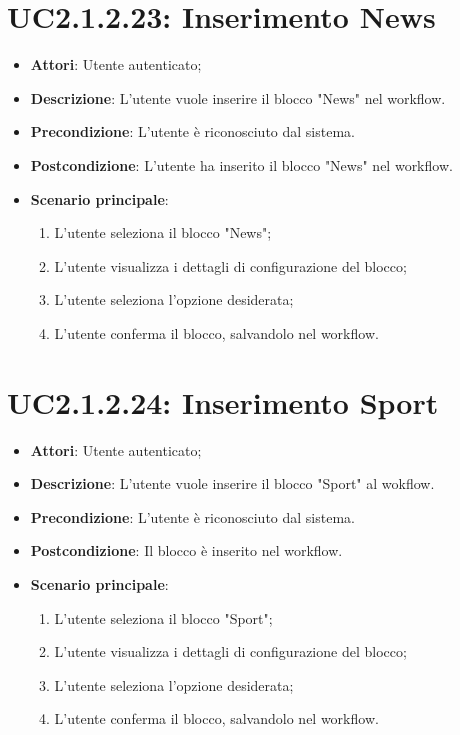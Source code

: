 \section{UC2.1.2.23: Inserimento News}
\label{UC2.1.2.23}
\begin{itemize}
	\item \textbf{Attori}: Utente autenticato;
	\item \textbf{Descrizione}: L'utente vuole inserire il blocco "News" nel workflow.
	\item \textbf{Precondizione}: L'utente è riconosciuto dal sistema.
	\item \textbf{Postcondizione}: L'utente ha inserito il blocco "News" nel workflow.
	\item \textbf{Scenario principale}:
	\begin{enumerate} \item L'utente seleziona il blocco "News";  \item L'utente visualizza i dettagli di configurazione del blocco; \item  L'utente seleziona l'opzione desiderata;  \item  L'utente conferma il blocco, salvandolo nel workflow.\end{enumerate}
\end{itemize}

\section{UC2.1.2.24: Inserimento Sport}
\label{UC2.1.2.24}
\begin{itemize}
	\item \textbf{Attori}: Utente autenticato;
	\item \textbf{Descrizione}: L'utente vuole inserire il blocco "Sport" al wokflow.
	\item \textbf{Precondizione}: L'utente è riconosciuto dal sistema.
	\item \textbf{Postcondizione}: Il blocco è inserito nel workflow.
	\item \textbf{Scenario principale}:
	\begin{enumerate} \item L'utente seleziona il blocco "Sport";  \item L'utente visualizza i dettagli di configurazione del blocco; \item  L'utente seleziona l'opzione desiderata;  \item  L'utente conferma il blocco, salvandolo nel workflow.\end{enumerate}
\end{itemize}


